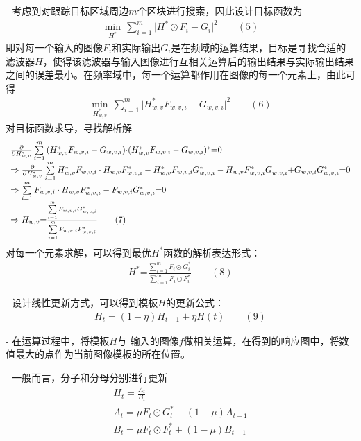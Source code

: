 - 考虑到对跟踪目标区域周边$m$个区块进行搜索，因此设计目标函数为
\begin{align}
\underset{{{H}^{*}}}{\mathop{\min }}\,\sum\limits_{i=1}^{m}{|{{H}^{*}}\odot{{F}_{i}}-{{G}_{i}}{{|}^{2}}} \qquad (5)
\end{align}
即对每一个输入的图像$F_i$和实际输出$G_i$是在频域的运算结果，目标是寻找合适的滤波器$H$，使得该滤波器与输入图像进行互相关运算后的输出结果与实际输出结果之间的误差最小。在频率域中，每一个运算都作用在图像的每一个元素上，由此可得
\begin{align}
\underset{H_{w,v}^{*}}{\mathop{\min }}\,\sum\limits_{i=1}^{m}{|H_{w,v}^{*}{{F}_{w,v,i}}-{{G}_{w,v,i}}{{|}^{2}}}\qquad (6)
\end{align}
对目标函数求导，寻找解析解
\begin{align}
\begin{array}{l} \frac{\partial }{{\partial H_{w,v}^*}}\sum\limits_{i = 1}^m {(H_{w,v}^*{F_{w,v,i}} - {G_{w,v,i}}) \cdot } {(H_{w,v}^*{F_{w,v,i}} - {G_{w,v,i}})^{\rm{*}}}{\rm{ = }}0\\  \Rightarrow \frac{\partial }{{\partial H_{w,v}^*}}\sum\limits_{i = 1}^m {H_{w,v}^*{F_{w,v,i}} \cdot {H_{w,v}}F_{w,v,i}^{\rm{*}} - H_{w,v}^*{F_{w,v,i}}G_{w,v,i}^{\rm{*}} - {H_{w,v}}F_{w,v,i}^{\rm{*}}G_{w,v,i}^{}{\rm{ + }}{G_{w,v,i}}G_{w,v,i}^{\rm{*}}} {\rm{ = }}0\\  \Rightarrow \sum\limits_{i = 1}^m {{F_{w,v,i}} \cdot {H_{w,v}}F_{w,v,i}^{\rm{*}} - {F_{w,v,i}}G_{w,v,i}^{\rm{*}}} {\rm{ = }}0\\  \Rightarrow {H_{w,v}}{\rm{ = }}\frac{{\sum\limits_{i = 1}^m {{F_{w,v,i}}G_{w,v,i}^{\rm{*}}} }}{{\sum\limits_{i = 1}^m {{F_{w,v,i}}F_{w,v,i}^{\rm{*}}} }} \qquad (7) \end{array}
\end{align}
对每一个元素求解，可以得到最优$H^*$函数的解析表达形式：
\begin{align}
H^*\text{=}\frac{\sum\limits_{i=1}^{m}{{{F}_{i}}\odot G_{i}^{\text{*}}}}{\sum\limits_{i=1}^{m}{{{F}_{i}}\odot F_{i}^{\text{*}}}}\qquad (8)
\end{align}

- 设计线性更新方式，可以得到模板$H$的更新公式：
\begin{align}
{{H}_{t}}=(1-\eta ){{H}_{t-1}}+\eta H(t)\qquad (9)
\end{align}

- 在运算过程中，将模板$H$与 输入的图像$f$做相关运算，在得到的响应图中，将数值最大的点作为当前图像模板的所在位置。

- 一般而言，分子和分母分别进行更新
\begin{align}
H_t=\frac{A_t}{B_t}\\
A_t=\mu F_t\odot G_t^*+(1-\mu)A_{t-1}\\
B_t=\mu F_t\odot F_t^*+(1-\mu)B_{t-1}
\end{align}






